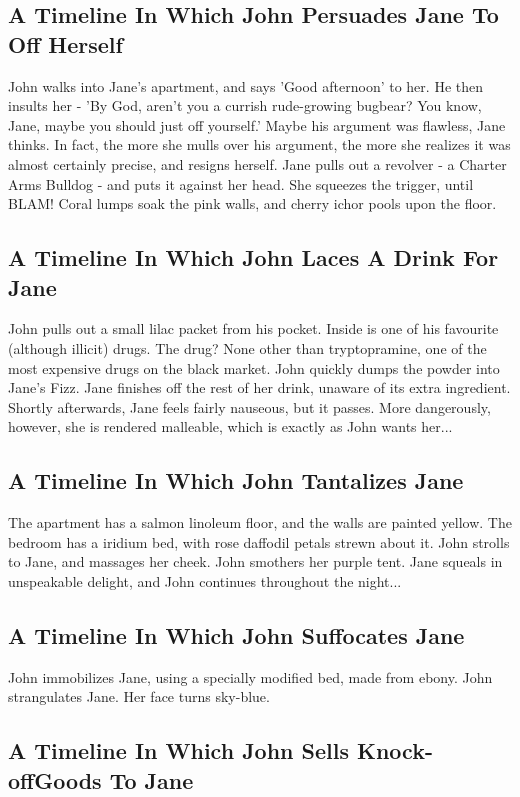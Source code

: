 \documentclass{article}
\begin{document}
\subsection{A Timeline In Which John Persuades Jane To Off Herself}


John walks into Jane's apartment, and says 'Good afternoon' to her.
He then insults her {-} 'By God, aren't you a currish rude{-}growing bugbear?
You know, Jane, maybe you should just off yourself.'
Maybe his argument was flawless, Jane thinks.
In fact, the more she mulls over his argument, the more she realizes it was almost certainly precise, and resigns herself.
Jane pulls out a revolver {-} a Charter Arms Bulldog {-} and puts it against her head.
She squeezes the trigger, until BLAM!
Coral lumps soak the pink walls, and cherry ichor pools upon the floor.
\subsection{A Timeline In Which John Laces A Drink For Jane}


John pulls out a small lilac packet from his pocket. Inside is one of his favourite (although illicit) drugs.
The drug? None other than tryptopramine, one of the most expensive drugs on the black market.
John quickly dumps the powder into Jane's Fizz.
Jane finishes off the rest of her drink, unaware of its extra ingredient.
Shortly afterwards, Jane feels fairly nauseous, but it passes.
More dangerously, however, she is rendered malleable, which is exactly as John wants her...
\subsection{A Timeline In Which John Tantalizes Jane}


The apartment has a salmon linoleum floor, and the walls are painted yellow.
The bedroom has a iridium bed, with rose daffodil petals strewn about it.
John strolls to Jane, and massages her cheek.
John smothers her purple tent.
Jane squeals in unspeakable delight, and John continues throughout the night...
\subsection{A Timeline In Which John Suffocates Jane}


John immobilizes Jane, using a specially modified bed, made from ebony.
John strangulates Jane.
Her face turns sky{-}blue.
\subsection{A Timeline In Which John Sells Knock{-}offGoods To Jane}
\end{document}
